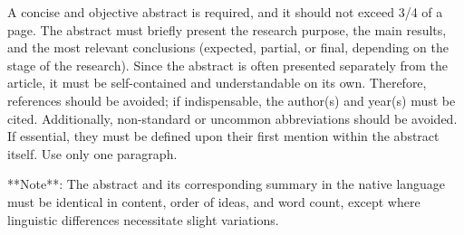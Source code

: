 A concise and objective abstract is required, and it should not exceed 3/4 of a page. The abstract must briefly present the research purpose, the main results, and the most relevant conclusions (expected, partial, or final, depending on the stage of the research). Since the abstract is often presented separately from the article, it must be self-contained and understandable on its own. Therefore, references should be avoided; if indispensable, the author(s) and year(s) must be cited. Additionally, non-standard or uncommon abbreviations should be avoided. If essential, they must be defined upon their first mention within the abstract itself. Use only one paragraph.

**Note**: The abstract and its corresponding summary in the native language must be identical in content, order of ideas, and word count, except where linguistic differences necessitate slight variations.
